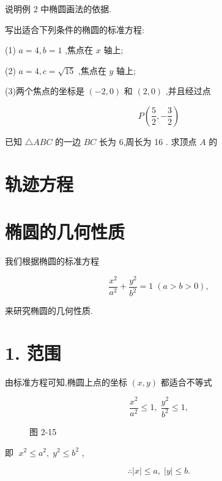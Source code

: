 \documentclass[lang=cn,newtx,12pt,scheme=chinese]{elegantbook}
\begin{document}
\begin{problemset}[练习]

\item 说明例 2 中椭圆画法的依据.

\item 写出适合下列条件的椭圆的标准方程:

(1) \(a = 4,b = 1\) ,焦点在 \(x\) 轴上;

(2) \(a = 4,c = \sqrt{15}\) ,焦点在 \(y\) 轴上;

(3)两个焦点的坐标是 \(\left( {-2,0}\right)\) 和 \(\left( {2,0}\right)\) ,并且经过点

\[
  P\left( {\frac{5}{2}, - \frac{3}{2}}\right)
\]

\item 已知 \(\bigtriangleup {ABC}\) 的一边 \({BC}\) 长为 6,周长为 16 . 求顶点 \(A\) 的

\end{problemset}

\section*{轨迹方程}

\section{椭圆的几何性质}

我们根据椭圆的标准方程

\[
  \frac{{x}^{2}}{{a}^{2}} + \frac{{y}^{2}}{{b}^{2}} = 1\;\left( {a > b > 0}\right) ,
\]

来研究椭圆的几何性质.

\section*{1. 范围}

由标准方程可知,椭圆上点的坐标 \(\left( {x,y}\right)\) 都适合不等式

\[
  \frac{{x}^{2}}{{a}^{2}} \leq 1,\;\frac{{y}^{2}}{{b}^{2}} \leq 1,
\]

\begin{figure}[h]
  \centering
  
  \caption{图 2-15}
\end{figure}

即 \(\;{x}^{2} \leq {a}^{2},\;{y}^{2} \leq {b}^{2}\) ,

\[
  \therefore \left| x\right| \leq a,\;\left| y\right| \leq b\text{.}
\]
\end{document}
